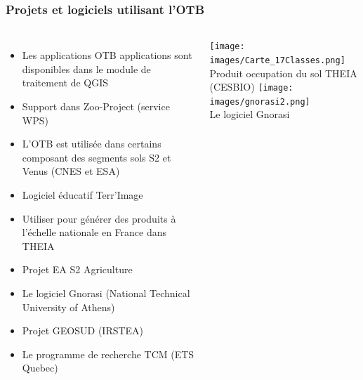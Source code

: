 \documentclass[8pt]{beamer}
\begin{document}
\begin{frame}
  \frametitle{Projets et logiciels utilisant l'OTB}
  \vspace{-0.5cm}
\begin{columns}
  \begin{itemize}
    \item Les applications OTB applications sont disponibles dans le module de traitement de QGIS
    \item Support dans Zoo-Project (service WPS)
    \item L'OTB est utilisée dans certains composant des segments sols S2 et
      Venus (CNES et ESA)
    \item Logiciel éducatif Terr'Image
    \item Utiliser pour générer des produits à l'échelle nationale en France
      dans THEIA
    \item Projet EA S2 Agriculture
    \item Le logiciel Gnorasi (National Technical University of Athens)
    \item Projet GEOSUD (IRSTEA)
    \item Le programme de recherche TCM (ETS Quebec)
  \end{itemize}
\begin{center}
  \texttt{[image: images/Carte\_17Classes.png]}\\
  \tiny{Produit occupation du sol THEIA (CESBIO)}
  \texttt{[image: images/gnorasi2.png]}\\
  \tiny{Le logiciel Gnorasi}
\end{center}
\end{columns}
\end{frame}
\end{document}
